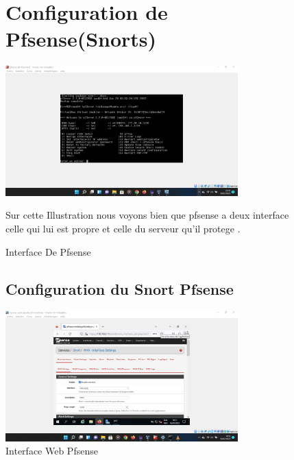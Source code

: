 \begin{figure}[h]
	\section{Configuration de Pfsense(Snorts)}
	
	\begin{center}
		\includegraphics[width=0.8\textwidth]{ PhotoMemoire/interfacepfsense.png}
		\caption{Interface De Pfsense }
	\end{center}
	Sur cette Illustration nous voyons bien que pfsense a deux interface celle qui lui est propre et celle du serveur qu'il protege .
\end{figure}


	  \begin{figure}[h]
	  	\subsection{Configuration du Snort Pfsense} 
	  	\begin{center}
	  		
	  	 	\includegraphics[width=0.8\textwidth]{photo_memoireConfig/configurationInterfaceServeur.png}
	  	 \caption{Interface Web Pfsense }
	  	\end{center}
	 \end{figure}
	 
